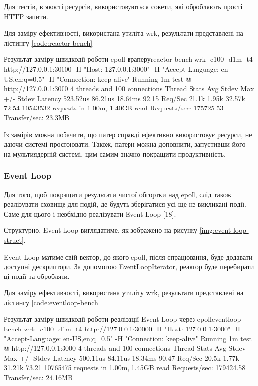 \documentclass{lib/styles/default-style}
\begin{document}

    Для тестів, в якості ресурсів, використовуються сокети, які обробляють прості HTTP запити.

    Для заміру ефективності, використана утиліта wrk, результати представлені на лістингу \ref{code:reactor-bench}

    \begin{stdout}{Результат заміру швидкодії роботи epoll враперу}{reactor-bench}
        wrk -c100 -d1m -t4 http://127.0.0.1:30000 -H "Host: 127.0.0.1:3000" -H "Accept-Language: en-US,en;q=0.5" -H "Connection: keep-alive"
        Running 1m test @ http://127.0.0.1:3000
        4 threads and 100 connections
        Thread Stats   Avg      Stdev     Max   +/- Stdev
            Latency   523.52us   86.21us  18.64ms   92.15%
            Req/Sec    21.1k     1.95k   32.57k    72.54%
        10543532 requests in 1.00m, 1.40GB read
        Requests/sec: 175725.53
        Transfer/sec:     23.3MB
    \end{stdout}

    Із замірів можна побачити, що патер справді ефективно використовує ресурси, не даючи системі простоювати.
    Також, патерн можна доповнити, запустивши його на мультиядерній системі, цим самим значно покращити продуктивність.

    \subsubsection{Event Loop}
    
    Для того, щоб покращити результати чистої обгортки над epoll,
    слід також реалізувати сховище для подій, де будуть зберігатися усі ще не викликані події. 
    Саме для цього і необхідно реалізувати Event Loop [18].

    Структурно, Event Loop виглядатиме, як зображено на рисунку \ref{img:event-loop-struct}.


    Event Loop матиме свій вектор, до якого epoll, після спрацювання, буде додавати доступні дескриптори.
    За допомогою EventLoopIterator, реактор буде перебирати ці події та обробляти.

    Для заміру ефективності, використана утиліту wrk, результати представлені на лістингу \ref{code:eventloop-bench}

    \begin{stdout}{Результат заміру швидкодії роботи реалізації Event Loop через epoll}{eventloop-bench}
        wrk -c100 -d1m -t4 http://127.0.0.1:30000 -H "Host: 127.0.0.1:3000" -H "Accept-Language: en-US,en;q=0.5" -H "Connection: keep-alive"
        Running 1m test @ http://127.0.0.1:3000
        4 threads and 100 connections
        Thread Stats   Avg      Stdev     Max   +/- Stdev
            Latency   500.11us   84.11us  18.34ms   90.47%
            Req/Sec    20.5k     1.77k   31.21k    73.21%
        10765475 requests in 1.00m, 1.45GB read
        Requests/sec:  179424.58
        Transfer/sec:     24.16MB
    \end{stdout}
\end{document}
